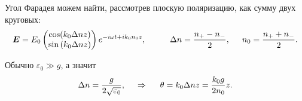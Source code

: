 Угол Фарадея можем найти, рассмотрев плоскую поляризацию, как сумму двух круговых:
\begin{equation*}
    \vc{E} = E_0 \begin{pmatrix}
        \cos(k_0 \Delta n z) \\ \sin\left(k_0 \Delta n z\right)
    \end{pmatrix} e^{-i \omega t + i k_0 n_0 z},
    \hspace{10 mm} 
    \Delta n = \frac{n_+ - n_-}{2},
    \hspace{5 mm} 
    n_0 = \frac{n_+ + n_-}{2}.
\end{equation*}

Обычно $\varepsilon_0 \gg g$, а значит
\begin{equation*}
    \Delta n = \frac{g}{2 \sqrt{\varepsilon_0}},
    \hspace{0.5cm} \Rightarrow \hspace{0.5cm}
    \theta = k_0 \Delta n z = \frac{k_0 g}{2 n_0} z.
\end{equation*}